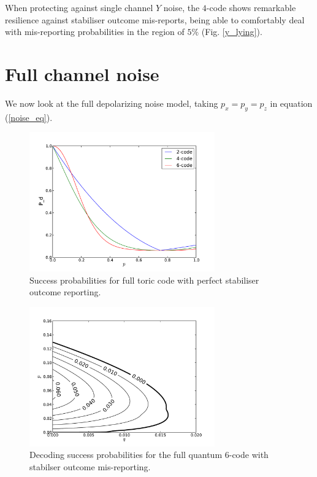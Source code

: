 When protecting against single channel $Y$ noise, the $4$-code shows remarkable resilience against stabiliser outcome mis-reports, being able to comfortably deal with mis-reporting probabilities in the region of $5\%$ (Fig. \ref{y_lying}).

\section{Full channel noise}

We now look at the full depolarizing noise model, taking $p_x = p_y = p_z$ in equation (\ref{noise_eq}). 

\begin{figure}[htb]
  \begin{center}
    \includegraphics[width=8cm]{assets/full_truthful.pdf}
  \end{center}
  \caption{Success probabilities for full toric code with perfect stabiliser outcome reporting.}
  \label{full_truthful}
\end{figure}
\begin{figure}[htb]
  \begin{center}
    \includegraphics[width=8cm]{assets/full_lying.pdf}
  \end{center}
  \caption{Decoding success probabilities for the full quantum $6$-code with stabilser outcome mis-reporting.}
  \label{full_lying}
\end{figure}

